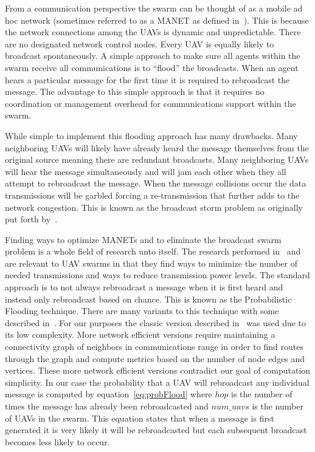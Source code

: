 From a communication perspective the swarm can be thought of as a mobile ad hoc network (sometimes referred to as a MANET as defined in~\textcite{manet_definition}).  This is because the network connections among the UAVs is dynamic and unpredictable.  There are no designated network control nodes.  Every UAV is equally likely to broadcast spontaneously.  A simple approach to make sure all agents within the swarm receive all communications is to ``flood'' the broadcasts.  When an agent hears a particular message for the first time it is required to rebroadcast the message.  The advantage to this simple approach is that it requires no coordination or management overhead for communications support within the swarm.

While simple to implement this flooding approach has many drawbacks.  Many neighboring UAVs will likely have already heard the message themselves from the original source meaning there are redundant broadcasts.  Many neighboring UAVs will hear the message simultaneously and will jam each other when they all attempt to rebroadcast the message.  When the message collisions occur the data transmissions will be garbled forcing a re-transmission that further adds to the network congestion.  This is known as the broadcast storm problem as originally put forth by~\textcite{bstorm}.
	
Finding ways to optimize MANETs and to eliminate the broadcast swarm problem is a whole field of research unto itself.  The research performed in~\textcite{epidemicManets} and ~\textcite{analysisOptNodeDen} are relevant to UAV swarms in that they find ways to minimize the number of needed transmissions and ways to reduce transmission power levels.  The standard approach is to not always rebroadcast a message when it is first heard and instead only rebroadcast based on chance.  This is known as the Probabilistic Flooding technique.  There are many variants to this technique with some described in~\textcite{probFloodVariants}.  For our purposes the classic version described in~\textcite{simpleProbFlood} was used due to its low complexity.  More network efficient versions require maintaining a connectivity graph of neighbors in communications range in order to find routes through the graph and compute metrics based on the number of node edges and vertices.  These more network efficient versions contradict our goal of computation simplicity.  In our case the probability that a UAV will rebroadcast any individual message is computed by equation~\ref{eq:probFlood} where $hop$ is the number of times the message has already been rebroadcasted and $num\_uavs$ is the number of UAVs in the swarm.  This equation states that when a message is first generated it is very likely it will be rebroadcasted but each subsequent broadcast becomes less likely to occur.


